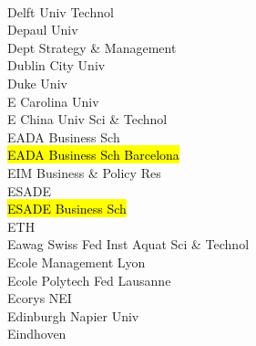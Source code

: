 \documentclass[a4paper]{article}
\begin{document}
\begin{multicols*}{2}
\begin{footnotesize}
\\ Delft Univ Technol \\ Depaul Univ \\ Dept Strategy \& Management \\ Dublin City Univ \\ Duke Univ \\ E Carolina Univ \\ E China Univ Sci \& Technol \\ EADA Business Sch \\ \hl{EADA Business Sch Barcelona} \\ EIM Business \& Policy Res \\ ESADE \\ \hl{ESADE Business Sch} \\ ETH \\ Eawag Swiss Fed Inst Aquat Sci \& Technol \\ Ecole Management Lyon \\ Ecole Polytech Fed Lausanne \\ Ecorys NEI \\ Edinburgh Napier Univ \\ Eindhoven
\end{footnotesize}
\end{multicols*}
\end{document}
